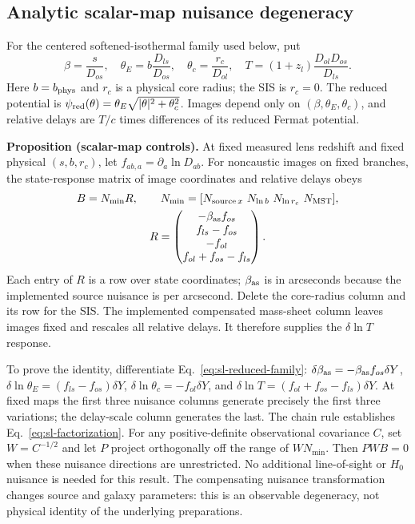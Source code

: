 \subsection{Analytic scalar-map nuisance degeneracy}
For the centered softened-isothermal family used below, put
\begin{equation}
 \beta=\frac{s}{D_{os}},\quad
 \theta_E=b\frac{D_{ls}}{D_{os}},\quad
 \theta_c=\frac{r_c}{D_{ol}},\quad
 T=(1+z_l)\frac{D_{ol}D_{os}}{D_{ls}}.
 \label{eq:sl-reduced-family}
\end{equation}
Here $b=b_{\rm phys}$ and $r_c$ is a physical core radius; the SIS is
$r_c=0$. The reduced potential is
$\psi_{\rm red}(\theta)=\theta_E\sqrt{|\theta|^2+\theta_c^2}$.
Images depend only on $(\beta,\theta_E,\theta_c)$, and relative delays
are $T/c$ times differences of its reduced Fermat potential.

\noindent\textbf{Proposition (scalar-map controls).}
At fixed measured lens redshift and fixed physical $(s,b,r_c)$, let
$f_{ab,a}=\partial_a\ln D_{ab}$. For noncaustic images on fixed branches,
the state-response matrix of image coordinates and relative delays obeys
\begin{equation}
 \begin{gathered}
 B=N_{\min}R,\qquad
 N_{\min}=[N_{{\rm source}\,x}\ N_{\ln b}\ N_{\ln r_c}\ N_{\rm MST}],\\
 R=\begin{pmatrix}
 -\beta_{\rm as}f_{os}\\
 f_{ls}-f_{os}\\
 -f_{ol}\\
 f_{ol}+f_{os}-f_{ls}
 \end{pmatrix}.
 \end{gathered}
 \label{eq:sl-factorization}
\end{equation}
Each entry of $R$ is a row over state coordinates; $\beta_{\rm as}$
is in arcseconds because the implemented source nuisance is per arcsecond.
Delete the core-radius column and its row for the SIS. The implemented
compensated mass-sheet column leaves images fixed and rescales all
relative delays. It therefore supplies the $\delta\ln T$ response.

To prove the identity, differentiate Eq.~\eqref{eq:sl-reduced-family}:
$\delta\beta_{\rm as}=-\beta_{\rm as}f_{os}\delta Y$,
$\delta\ln\theta_E=(f_{ls}-f_{os})\delta Y$,
$\delta\ln\theta_c=-f_{ol}\delta Y$, and
$\delta\ln T=(f_{ol}+f_{os}-f_{ls})\delta Y$.
At fixed maps the first three nuisance columns generate precisely the
first three variations; the delay-scale column generates the last.
The chain rule establishes Eq.~\eqref{eq:sl-factorization}.
For any positive-definite observational covariance $C$, set
$W=C^{-1/2}$ and let $P$ project orthogonally off the range of
$WN_{\min}$. Then $PWB=0$ when these nuisance directions are unrestricted.
No additional line-of-sight or $H_0$ nuisance is needed for this result.
The compensating nuisance transformation changes source and galaxy
parameters: this is an observable degeneracy, not physical identity of
the underlying preparations.

